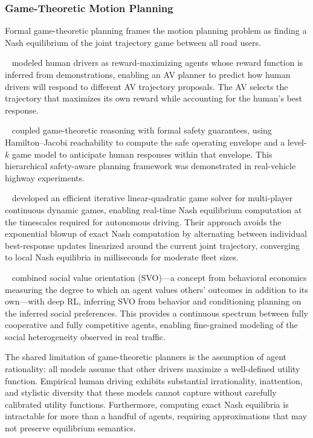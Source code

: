 \documentclass[12pt, a4paper]{article}
\begin{document}
\subsubsection{Game-Theoretic Motion Planning}

Formal game-theoretic planning frames the motion planning problem as finding
a Nash equilibrium of the joint trajectory game between all road users.

\citeauthor{sadigh2016planning}~\cite{sadigh2016planning} modeled human drivers
as reward-maximizing agents whose reward function is inferred from demonstrations,
enabling an AV planner to predict how human drivers will respond to different
AV trajectory proposals.  The AV selects the trajectory that maximizes its own
reward while accounting for the human's best response.

\citeauthor{fisac2019hierarchical}~\cite{fisac2019hierarchical} coupled
game-theoretic reasoning with formal safety guarantees, using Hamilton--Jacobi
reachability to compute the safe operating envelope and a level-$k$ game model
to anticipate human responses within that envelope.  This hierarchical
safety-aware planning framework was demonstrated in real-vehicle highway
experiments.

\citeauthor{fridovich2020efficient}~\cite{fridovich2020efficient} developed an
efficient iterative linear-quadratic game solver for multi-player continuous
dynamic games, enabling real-time Nash equilibrium computation at the timescales
required for autonomous driving.  Their approach avoids the exponential blowup
of exact Nash computation by alternating between individual best-response
updates linearized around the current joint trajectory, converging to local Nash
equilibria in milliseconds for moderate fleet sizes.

\citeauthor{schwarting2021deep}~\cite{schwarting2021deep} combined social value
orientation (SVO)---a concept from behavioral economics measuring the degree
to which an agent values others' outcomes in addition to its own---with deep
RL, inferring SVO from behavior and conditioning planning on the inferred
social preferences.  This provides a continuous spectrum between fully
cooperative and fully competitive agents, enabling fine-grained modeling of
the social heterogeneity observed in real traffic.

The shared limitation of game-theoretic planners is the assumption of agent
rationality: all models assume that other drivers maximize a well-defined utility
function.  Empirical human driving exhibits substantial irrationality,
inattention, and stylistic diversity that these models cannot capture without
carefully calibrated utility functions.  Furthermore, computing exact Nash
equilibria is intractable for more than a handful of agents, requiring
approximations that may not preserve equilibrium semantics.
\end{document}

